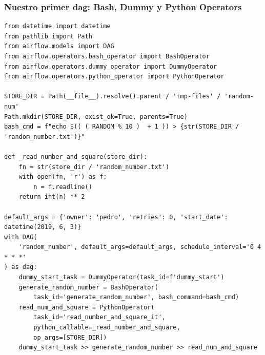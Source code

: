 \documentclass[leqno, 10pt, envcountsect]{beamer}
\numberwithin{equation}{section}
\theoremstyle{definition}
\theoremstyle{example}
\numberwithin{figure}{section}
\numberwithin{table}{section}
\begin{document}
\begin{frame}[fragile=singleslide]
  \frametitle{Nuestro primer dag: Bash, Dummy y Python Operators}
  \begin{verbatim}
from datetime import datetime
from pathlib import Path
from airflow.models import DAG
from airflow.operators.bash_operator import BashOperator
from airflow.operators.dummy_operator import DummyOperator
from airflow.operators.python_operator import PythonOperator

STORE_DIR = Path(__file__).resolve().parent / 'tmp-files' / 'random-num'
Path.mkdir(STORE_DIR, exist_ok=True, parents=True)
bash_cmd = f"echo $(( ( RANDOM % 10 )  + 1 )) > {str(STORE_DIR / 'random_number.txt')}"

def _read_number_and_square(store_dir):
    fn = str(store_dir / 'random_number.txt')
    with open(fn, 'r') as f:
        n = f.readline()
    return int(n) ** 2

default_args = {'owner': 'pedro', 'retries': 0, 'start_date': datetime(2019, 6, 3)}
with DAG(
    'random_number', default_args=default_args, schedule_interval='0 4 * * *'
) as dag:
    dummy_start_task = DummyOperator(task_id=f'dummy_start')
    generate_random_number = BashOperator(
        task_id='generate_random_number', bash_command=bash_cmd)
    read_num_and_square = PythonOperator(
        task_id='read_number_and_square_it',
        python_callable=_read_number_and_square,
        op_args=[STORE_DIR])
    dummy_start_task >> generate_random_number >> read_num_and_square
  \end{verbatim}

\end{frame}
\end{document}
